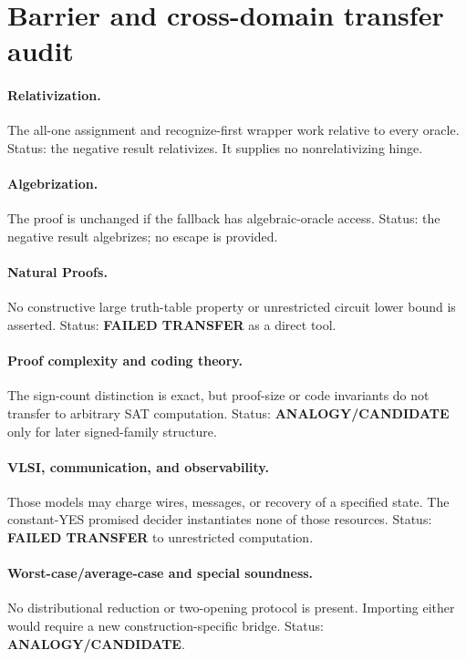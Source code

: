 \documentclass[11pt]{article}
\begin{document}
\section{Barrier and cross-domain transfer audit}

\paragraph{Relativization.}
The all-one assignment and recognize-first wrapper work relative to every
oracle.  Status: the negative result relativizes.  It supplies no
nonrelativizing hinge.

\paragraph{Algebrization.}
The proof is unchanged if the fallback has algebraic-oracle access.
Status: the negative result algebrizes; no escape is provided.

\paragraph{Natural Proofs.}
No constructive large truth-table property or unrestricted circuit lower
bound is asserted.  Status: \textbf{FAILED TRANSFER} as a direct tool.

\paragraph{Proof complexity and coding theory.}
The sign-count distinction is exact, but proof-size or code invariants do
not transfer to arbitrary SAT computation.  Status:
\textbf{ANALOGY/CANDIDATE} only for later signed-family structure.

\paragraph{VLSI, communication, and observability.}
Those models may charge wires, messages, or recovery of a specified state.
The constant-YES promised decider instantiates none of those resources.
Status: \textbf{FAILED TRANSFER} to unrestricted computation.

\paragraph{Worst-case/average-case and special soundness.}
No distributional reduction or two-opening protocol is present.  Importing
either would require a new construction-specific bridge.  Status:
\textbf{ANALOGY/CANDIDATE}.
\end{document}
